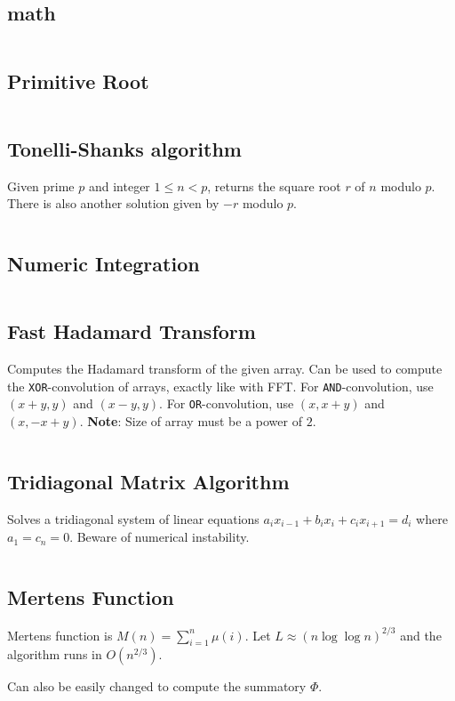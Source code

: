 \documentclass[8pt,a4paper,landscape,oneside]{amsart}
\newcommand{\code}[1]{\inputminted[fontsize=\normalsize,baselinestretch=1,breaklines,tabsize=2]{cpp}{code/#1}}
\newif\ifverbose
\begin{document}
\begin{multicols*}{3}
\section{math}

\code{math/math.cpp}

\subsection{Primitive Root}
\code{math/primitive_root.cpp}

\subsection{Tonelli-Shanks algorithm}
        Given prime $p$ and integer $1\leq n<p$, returns the square root $r$ of
        $n$ modulo $p$. There is also another solution given by $-r$ modulo
        $p$.
        \code{math/tonelli_shanks.cpp}

\subsection{Numeric Integration}
        \ifverbose
        Numeric integration using Simpson's rule.
        \fi
        \code{math/numeric_integration.cpp}

\subsection{Fast Hadamard Transform}
        Computes the Hadamard transform of the given array. Can be used to
        compute the \texttt{XOR}-convolution of arrays, exactly like with FFT.
        For \texttt{AND}-convolution, use $(x+y,y)$ and $(x-y,y)$. For
        \texttt{OR}-convolution, use $(x,x+y)$ and $(x,-x+y)$. \textbf{Note}:
        Size of array must be a power of $2$.
        \code{math/fht.cpp}

\subsection{Tridiagonal Matrix Algorithm}
        Solves a tridiagonal system of linear equations $a_ix_{i-1} + b_ix_i +
        c_ix_{i+1} = d_i$ where $a_1 = c_n = 0$. Beware of numerical
        instability.
        \code{math/tridiagonal.cpp}

\subsection{Mertens Function}
        Mertens function is $M(n) = \sum_{i=1}^n \mu(i)$. Let $L\approx
        (n\log{\log{n}})^{2/3}$ and the algorithm runs in $O(n^{2/3})$.
        \ifverbose
        \else
            Can also be easily changed to compute the summatory $\Phi$.
        \fi
        \code{math/mertens.cpp}
    \ifverbose
    

\end{multicols*}
\end{document}
